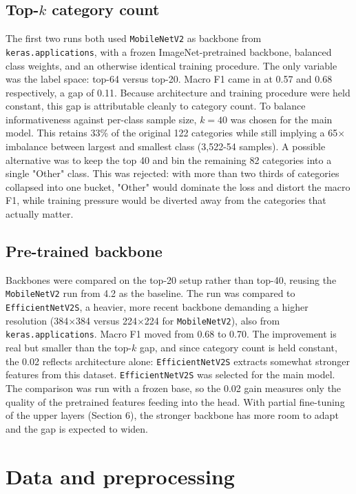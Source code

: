 \subsection{Top-$k$ category count}
The first two runs both used \texttt{MobileNetV2} as backbone from \texttt{keras.applications}, with a frozen ImageNet-pretrained backbone, balanced class weights, and an otherwise identical training procedure. The only variable was the label space: top-64 versus top-20. Macro F1 came in at 0.57 and 0.68 respectively, a gap of 0.11. Because architecture and training procedure were held constant, this gap is attributable cleanly to category count.
To balance informativeness against per-class sample size, $k=40$ was chosen for the main model. This retains 33\% of the original 122 categories while still implying a 65$\times$ imbalance between largest and smallest class (3,522-54 samples).
A possible alternative was to keep the top 40 and bin the remaining 82 categories into a single "Other" class. This was rejected: with more than two thirds of categories collapsed into one bucket, "Other" would dominate the loss and distort the macro F1, while training pressure would be diverted away from the categories that actually matter.

\subsection{Pre-trained backbone}
Backbones were compared on the top-20 setup rather than top-40, reusing the \texttt{MobileNetV2} run from 4.2 as the baseline. The run was compared to \texttt{EfficientNetV2S}, a heavier, more recent backbone demanding a higher resolution (384$\times$384 versus 224$\times$224 for \texttt{MobileNetV2}), also from \texttt{keras.applications}. Macro F1 moved from 0.68 to 0.70. The improvement is real but smaller than the top-$k$ gap, and since category count is held constant, the 0.02 reflects architecture alone: \texttt{EfficientNetV2S} extracts somewhat stronger features from this dataset.
\texttt{EfficientNetV2S} was selected for the main model. The comparison was run with a frozen base, so the 0.02 gain measures only the quality of the pretrained features feeding into the head. With partial fine-tuning of the upper layers (Section 6), the stronger backbone has more room to adapt and the gap is expected to widen.

\section{Data and preprocessing}
